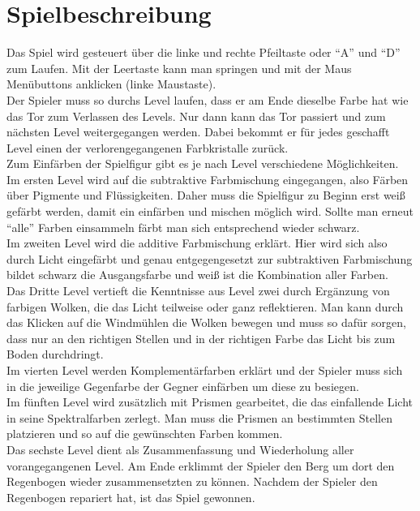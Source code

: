 \documentclass[10pt,a4paper,notitlepage]{report}
\begin{document}
	\clearpage

	\chapter{Spielbeschreibung}
	Das Spiel wird gesteuert über die linke und rechte Pfeiltaste oder \enquote{A} und \enquote{D} zum Laufen. Mit der Leertaste kann man springen und mit der Maus Menübuttons anklicken (linke Maustaste).\\
	Der Spieler muss so durchs Level laufen, dass er am Ende dieselbe Farbe hat wie das Tor zum Verlassen des Levels. Nur dann kann das Tor passiert und zum nächsten Level weitergegangen werden. Dabei bekommt er für jedes geschafft Level einen der verlorengegangenen Farbkristalle zurück.\\
	Zum Einfärben der Spielfigur gibt es je nach Level verschiedene Möglichkeiten.\\
	Im ersten Level wird auf die subtraktive Farbmischung eingegangen, also Färben über Pigmente und Flüssigkeiten. Daher muss die Spielfigur zu Beginn erst weiß gefärbt werden, damit ein einfärben und mischen möglich wird. Sollte man erneut \enquote{alle} Farben einsammeln färbt man sich entsprechend wieder schwarz.\\
	Im zweiten Level wird die additive Farbmischung erklärt. Hier wird sich also durch Licht eingefärbt und genau entgegengesetzt zur subtraktiven Farbmischung bildet schwarz die Ausgangsfarbe und weiß ist die Kombination aller Farben.\\
	Das Dritte Level vertieft die Kenntnisse aus Level zwei durch Ergänzung von farbigen Wolken, die das Licht teilweise oder ganz reflektieren. Man kann durch das Klicken auf die Windmühlen die Wolken bewegen und muss so dafür sorgen, dass nur an den richtigen Stellen und in der richtigen Farbe das Licht bis zum Boden durchdringt.\\
	Im vierten Level werden Komplementärfarben erklärt und der Spieler muss sich in die jeweilige Gegenfarbe der Gegner einfärben um diese zu besiegen.\\
	Im fünften Level wird zusätzlich mit Prismen gearbeitet, die das einfallende Licht in seine Spektralfarben zerlegt. Man muss die Prismen an bestimmten Stellen platzieren und so auf die gewünschten Farben kommen.\\
	Das sechste Level dient als Zusammenfassung und Wiederholung aller vorangegangenen Level. Am Ende erklimmt der Spieler den Berg um dort den Regenbogen wieder zusammensetzten zu können. Nachdem der Spieler den Regenbogen repariert hat, ist das Spiel gewonnen.\\
\end{document}
